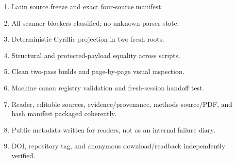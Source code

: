 \documentclass[11pt,a4paper]{article}
\begin{document}
\begin{enumerate}
  \item Latin source freeze and exact four-source manifest.
  \item All scanner blockers classified; no unknown parser state.
  \item Deterministic Cyrillic projection in two fresh roots.
  \item Structural and protected-payload equality across scripts.
  \item Clean two-pass builds and page-by-page visual inspection.
  \item Machine canon registry validation and fresh-session handoff test.
  \item Reader, editable sources, evidence/provenance, methods source/PDF, and hash manifest packaged coherently.
  \item Public metadata written for readers, not as an internal failure diary.
  \item DOI, repository tag, and anonymous download/readback independently verified.
\end{enumerate}
\end{document}
